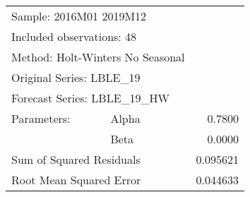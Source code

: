 
\begin{tabular}{lrrrr}
\toprule
\multicolumn{3}{l}{Sample: 2016M01 2019M12}&\multicolumn{1}{c}{}&\multicolumn{1}{c}{}\\
\multicolumn{3}{l}{Included observations: 48}&\multicolumn{1}{c}{}&\multicolumn{1}{c}{}\\
\multicolumn{4}{l}{Method: Holt-Winters No Seasonal}&\multicolumn{1}{c}{}\\
\multicolumn{3}{l}{Original Series: LBLE\_19}&\multicolumn{1}{c}{}&\multicolumn{1}{c}{}\\
\multicolumn{3}{l}{Forecast Series: LBLE\_19\_HW}&\multicolumn{1}{c}{}&\multicolumn{1}{c}{}\\
\midrule
\multicolumn{1}{l}{Parameters:}&\multicolumn{1}{l}{Alpha}&\multicolumn{1}{c}{}&\multicolumn{1}{c}{}&\multicolumn{1}{r}{0.7800}\\
\multicolumn{1}{c}{}&\multicolumn{1}{l}{Beta}&\multicolumn{1}{c}{}&\multicolumn{1}{c}{}&\multicolumn{1}{r}{0.0000}\\
\multicolumn{3}{l}{Sum of Squared Residuals}&\multicolumn{1}{c}{}&\multicolumn{1}{r}{0.095621}\\
\multicolumn{3}{l}{Root Mean Squared Error}&\multicolumn{1}{c}{}&\multicolumn{1}{r}{0.044633}\\
\bottomrule
\end{tabular}
